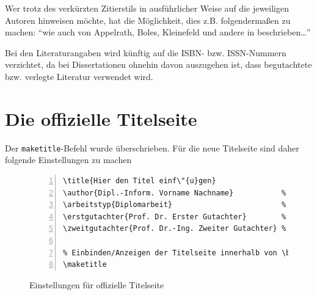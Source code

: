 \begin{verbatim}

\end{verbatim}

Wer trotz des verk\"{u}rzten Zitierstils in ausf\"{u}hrlicher Weise auf
die jeweiligen Autoren hinweisen m\"{o}chte, hat die M\"{o}glichkeit, dies
z.B. folgenderma{\ss}en zu machen: "`wie auch von Appelrath, Boles,
Kleinefeld und andere in
\cite{appelrath06} beschrieben\ldots"'

Bei den Literaturangaben wird k\"{u}nftig auf die ISBN- bzw.
ISSN-Nummern verzichtet, da bei Dissertationen ohnehin davon
auszugehen ist, dass begutachtete bzw. verlegte Literatur
verwendet wird.


\section{Die offizielle Titelseite}
Der \texttt{maketitle}-Befehl wurde \"{u}berschrieben. F\"{u}r die neue Titelseite
sind daher folgende Einstellungen zu machen

\begin{figure}[ht]
\centering
\begin{Verbatim}[label=dissertation.tex,numberblanklines=false,fontsize=\scriptsize,numbers=left,frame=single]
% Voreinstellungen f\"{u}r offizielle Titelseite
\title{Hier den Titel einf\"{u}gen}                   % Titel der Dissertation
\author{Dipl.-Inform. Vorname Nachname}           % Name des Autors
\arbeitstyp{Diplomarbeit}                         % oder Bachelorarbeit, Masterarbeit ...
\erstgutachter{Prof. Dr. Erster Gutachter}        % Name des Erstgutachters
\zweitgutachter{Prof. Dr.-Ing. Zweiter Gutachter} % Name des Zweitgutachters

% Einbinden/Anzeigen der Titelseite innerhalb von \begin/end{document}
\maketitle
\end{Verbatim}
\caption{Einstellungen f\"{u}r offizielle Titelseite}\label{titelseite}
\end{figure}
